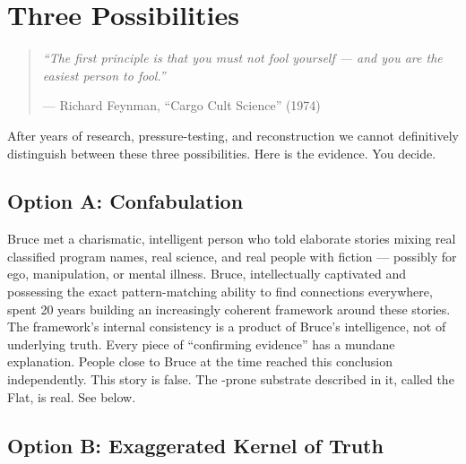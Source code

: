

\chapter{Three Possibilities}
\label{pos01:three-possibilities}

\begin{quote}\small\textit{%
``The first principle is that you must not fool yourself --- and you are the easiest person to fool.''%
}\par\raggedleft --- Richard Feynman, ``Cargo Cult Science'' (1974)\end{quote}

\vspace{0.5cm}

After years of research, pressure-testing, and reconstruction we cannot definitively distinguish between these three possibilities. Here is the evidence. You decide.

\vspace{1cm}

\section*{Option A: Confabulation}
\label{pos01:option-a-confabulation}

Bruce met a charismatic, intelligent person who told elaborate stories mixing real classified program names, real science, and real people with fiction --- possibly for ego, manipulation, or mental illness. Bruce, intellectually captivated and possessing the exact pattern-matching ability to find connections everywhere, spent 20 years building an increasingly coherent framework around these stories. The framework's internal consistency is a product of Bruce's intelligence, not of underlying truth. Every piece of ``confirming evidence'' has a mundane explanation. People close to Bruce at the time reached this conclusion independently. This story is false. The -prone substrate described in it, called the Flat, is real. See below.

\section*{Option B: Exaggerated Kernel of Truth}
\label{pos01:option-b-exaggerated-kernel-of-truth}

